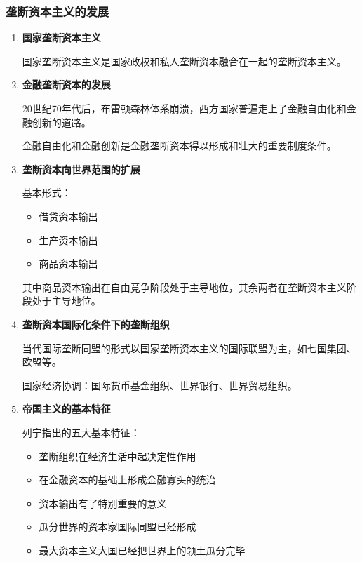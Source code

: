 \documentclass[12pt, a4paper, oneside]{ctexart}
\begin{document}
\subsubsection{垄断资本主义的发展}

\begin{enumerate}
  \item {\bf 国家垄断资本主义}
  
  国家垄断资本主义是国家政权和私人垄断资本融合在一起的垄断资本主义。

  \item {\bf 金融垄断资本的发展}
  
  20世纪70年代后，布雷顿森林体系崩溃，西方国家普遍走上了金融自由化和金融创新的道路。

  金融自由化和金融创新是金融垄断资本得以形成和壮大的重要制度条件。

  \item {\bf 垄断资本向世界范围的扩展}
  
  基本形式：
  \begin{itemize}
    \item 借贷资本输出
    \item 生产资本输出
    \item 商品资本输出
  \end{itemize}

  其中商品资本输出在自由竞争阶段处于主导地位，其余两者在垄断资本主义阶段处于主导地位。

  \item {\bf 垄断资本国际化条件下的垄断组织}
  
  当代国际垄断同盟的形式以国家垄断资本主义的国际联盟为主，如七国集团、欧盟等。

  国家经济协调：国际货币基金组织、世界银行、世界贸易组织。

  \item {\bf 帝国主义的基本特征}
  
  列宁指出的五大基本特征：
  \begin{itemize}
    \item 垄断组织在经济生活中起决定性作用
    \item 在金融资本的基础上形成金融寡头的统治
    \item 资本输出有了特别重要的意义
    \item 瓜分世界的资本家国际同盟已经形成
    \item 最大资本主义大国已经把世界上的领土瓜分完毕
  \end{itemize}
\end{enumerate}
\end{document}
